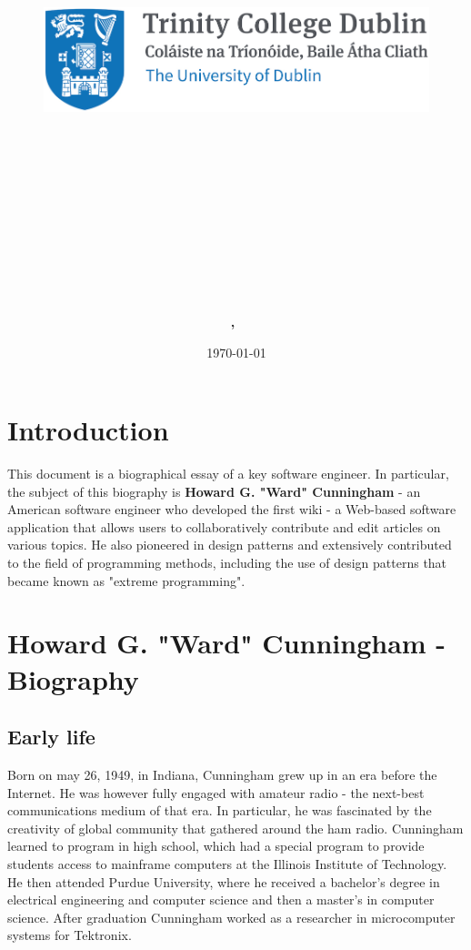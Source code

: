 \documentclass[11pt]{article}
\title{
\vspace{-1in}
\begin{figure}[!ht]
\flushleft
\includegraphics[width=0.4\linewidth]{reduced-trinity.png}
\end{figure}
\vspace{-0.5cm}
\hrulefill \\
\vspace{0.5cm}
\textmd{\textbf{\moduleCode\ \moduleName}}\\
\textmd{\textbf{\assignmentTitle}}\\
\vspace{0.5cm}
\hrulefill \\
}
\author{\textbf{\authorName,\ \authorID}}
\date{\today}
\begin{document}
\lstset{language=Java, captionpos=b, frame=single}
\captionsetup{width=.8\linewidth} 

\maketitle
\tableofcontents
\vspace{0.5in}

\section{Introduction}
\label{sec:Intro}
This document is a biographical essay of a key software engineer. In particular, the subject of this biography is \textbf{Howard G. "Ward" Cunningham} - an American software engineer who developed the first wiki - a Web-based  software  application  that  allows  users  to  collaboratively  contribute  and  edit  articles  on  various  topics.\cite{cs-encyclopedia} He also pioneered in design patterns and extensively contributed to the field of programming methods, including the use of design patterns that became known as "extreme programming".
 
\section{Howard G. "Ward" Cunningham - Biography}
\subsection{Early life}
\par
Born on may 26, 1949, in Indiana, Cunningham grew up in an era before the Internet. He was however fully engaged with amateur radio - the next-best communications medium of that era. In particular, he was fascinated by the creativity of global community that gathered around the ham radio. Cunningham learned to program in high school, which had a special program to provide students access to mainframe computers at the Illinois Institute of Technology.\cite{wiki-revolution}\cite{innovators} He then attended Purdue University, where he received a bachelor’s degree in electrical engineering and computer  science  and  then  a  master’s  in  computer  science. After  graduation  Cunningham  worked  as  a  researcher  in microcomputer  systems  for  Tektronix. \cite{cs-encyclopedia}
\end{document}
